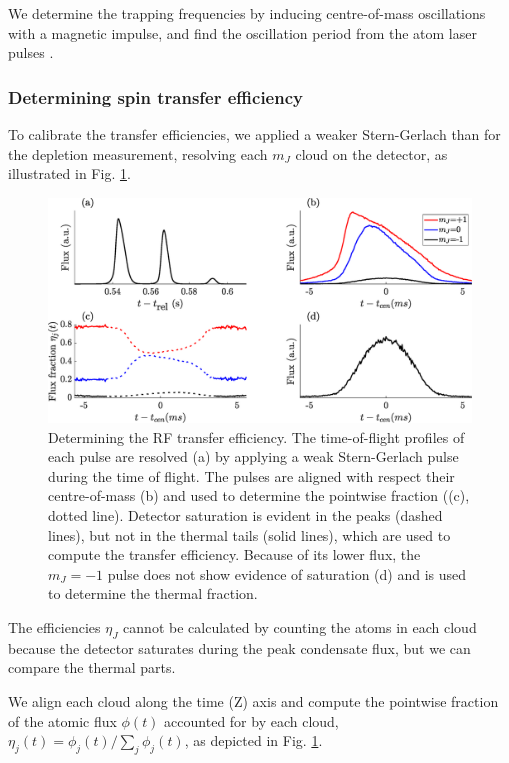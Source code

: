 	We determine the trapping frequencies by inducing centre-of-mass oscillations with a magnetic impulse, and find the oscillation period from the atom laser pulses \cite{Henson18ML}.


\subsubsection{Determining spin transfer efficiency}

	To calibrate the transfer efficiencies, we applied a weaker Stern-Gerlach than for the depletion measurement, resolving each $m_J$ cloud on the detector, as illustrated in Fig.
	\ref{fig:frac_cal}.
	

	\begin{figure}[!t]
	\begin{center}
		\includegraphics[width=\columnwidth]{fig/depletion/frac_cal_profile}
		\caption{Determining the RF transfer efficiency.
	The time-of-flight profiles of each pulse are resolved (a) by applying a weak Stern-Gerlach pulse during the time of flight.
	The pulses are aligned with respect their centre-of-mass (b) and used to determine the pointwise fraction ((c), dotted line).
	Detector saturation is evident in the peaks (dashed lines), but not in the thermal tails (solid lines), which are used to compute the transfer efficiency.
	Because of its lower flux, the $m_J=-1$ pulse does not show evidence of saturation (d) and is used to determine the thermal fraction.}
		\label{fig:frac_cal}
	\end{center}
	\end{figure}

	The efficiencies $\eta_J$ cannot be calculated by counting the atoms in each cloud because the detector saturates during the peak condensate flux, but we can compare the thermal parts.
	
	We align each cloud along the time (Z) axis and compute the pointwise fraction of the atomic flux $\phi(t)$ accounted for by each cloud, $\eta_j(t) = \phi_j(t)/\sum_j\phi_j(t)$, as depicted in Fig.
	\ref{fig:frac_cal}.
	
